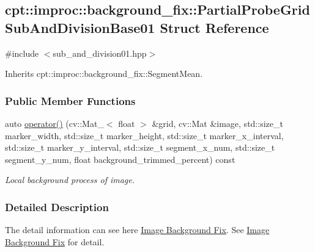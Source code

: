 \hypertarget{structcpt_1_1improc_1_1background__fix_1_1_partial_probe_grid_sub_and_division_base01}{\subsection{cpt\-:\-:improc\-:\-:background\-\_\-fix\-:\-:Partial\-Probe\-Grid\-Sub\-And\-Division\-Base01 Struct Reference}
\label{structcpt_1_1improc_1_1background__fix_1_1_partial_probe_grid_sub_and_division_base01}
}


 




{\ttfamily \#include $<$sub\-\_\-and\-\_\-division01.\-hpp$>$}



Inherits cpt\-::improc\-::background\-\_\-fix\-::\-Segment\-Mean.

\subsubsection*{Public Member Functions}
\begin{DoxyCompactItemize}
\item 
auto \hyperlink{structcpt_1_1improc_1_1background__fix_1_1_partial_probe_grid_sub_and_division_base01_addfcd5aed6872445d297dbaa6417fd74}{operator()} (cv\-::\-Mat\-\_\-$<$ float $>$ \&grid, cv\-::\-Mat \&image, std\-::size\-\_\-t marker\-\_\-width, std\-::size\-\_\-t marker\-\_\-height, std\-::size\-\_\-t marker\-\_\-x\-\_\-interval, std\-::size\-\_\-t marker\-\_\-y\-\_\-interval, std\-::size\-\_\-t segment\-\_\-x\-\_\-num, std\-::size\-\_\-t segment\-\_\-y\-\_\-num, float background\-\_\-trimmed\-\_\-percent) const 
\begin{DoxyCompactList}\small\item\em Local background process of image. \end{DoxyCompactList}\end{DoxyCompactItemize}


\subsubsection{Detailed Description}


The detail information can see here \hyperlink{improc_background_fix_sub_and_division01}{Image Background Fix}. See \hyperlink{improc_background_fix_sub_and_division01}{Image Background Fix} for detail. 

